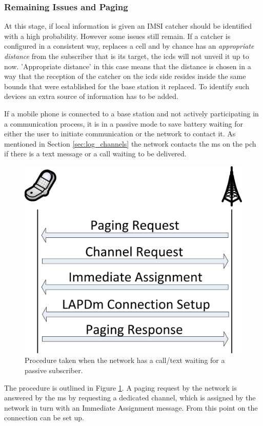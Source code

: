 \subsubsection{Remaining Issues and Paging}
At this stage, if local information is given an IMSI catcher should be identified with a high probability.
However some issues still remain.
If a catcher is configured in a consistent way, replaces a cell and by chance has an \emph{appropriate distance} from the subscriber that is its target, the \gls{icds} will not unveil it up to now.
'Appropriate distance' in this case means that the distance is chosen in a way that the reception of the catcher on the \gls{icds} side resides inside the same bounds that were established for the base station it replaced.
To identify such devices an extra source of information has to be added.

If a mobile phone is connected to a base station and not actively participating in a communication process, it is in a passive mode to save battery waiting for either the user to initiate communication or the network to contact it.
As mentioned in Section \ref{sec:log_channels} the network contacts the \gls{ms} on the \gls{pch} if there is a text message or a call waiting to be delivered.
\begin{figure}
\centering
\includegraphics{../Images/Paging}
\caption{Procedure taken when the network has a call/text waiting for a passive subscriber.}
\label{fig:paging}
\end{figure}
The procedure is outlined in Figure \ref{fig:paging}.
A paging request by the network is answered by the \gls{ms} by requesting a dedicated channel, which is assigned by the network in turn with an Immediate Assignment message.
From this point on the connection can be set up.

